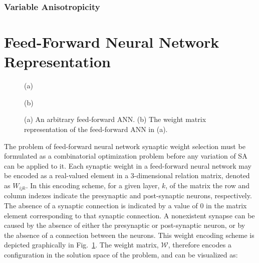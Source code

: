 \documentclass[11pt]{afthesis}
\begin{document}
	\subsubsection{Variable Anisotropicity}
	
	
	
	\section{Feed-Forward Neural Network Representation}
	
	\begin{figure}
		
		\begin{minipage}[b]{0.48\linewidth}
			\centering
			\centerline{}
			\centerline{(a)}\medskip
		\end{minipage}
		\hfill
		\begin{minipage}[b]{0.48\linewidth}
			\centering
			\centerline{}
			\centerline{(b)}\medskip
		\end{minipage}
		\caption{
			(a) An arbitrary feed-forward ANN.
			(b) The weight matrix representation of the feed-forward ANN in (a).}
		\label{fig:nettomatmapping}
	\end{figure}
	
	 The problem of feed-forward neural network synaptic weight selection must be formulated as a combinatorial optimization problem before any variation of SA can be applied to it. Each synaptic weight in a feed-forward neural network may be encoded as a real-valued element in a 3-dimensional relation matrix, denoted as $\mathit{W}_{ijk}$. In this encoding scheme, for a given layer, $k$, of the matrix the row and column indexes indicate the presynaptic and post-synaptic neurons, respectively. The absence of a synaptic connection is indicated by a value of $0$ in the matrix element corresponding to that synaptic connection. A nonexistent synapse can be caused by the absence of either the presynaptic or post-synaptic neuron, or by the absence of a connection between the neurons. This weight encoding scheme is depicted graphically in Fig.~\ref{fig:nettomatmapping}. The weight matrix, $\boldsymbol{\mathcal{W}}$, therefore encodes a configuration in the solution space of the problem, and can be visualized as:
	 
\end{document}
